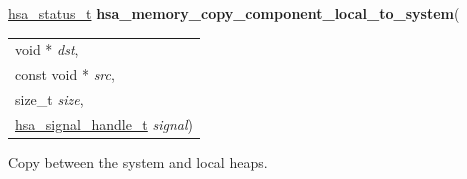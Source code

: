 \documentclass[final]{book}
\newcommand{\hsaarg}[1]{\textit{#1}}
\begin{document}
\noindent\begin{tcolorbox}[breakable,nobeforeafter,colframe=white,colback=lightgray,left=0mm]
\hyperlink{group__status_1gad755322e7ff95456520e8abdbe90d225}{hsa_status_t} \hypertarget{group__memory_1ga292a4a5210b402fbf4320197d1cd3264}{\textbf{hsa_memory_copy_component_local_to_system}}(
\vspace{-3.5mm}\begin{longtable}{@{}p{\textwidth}}
\hspace{1.7em}void * \hsaarg{dst},\\
\hspace{1.7em}const void * \hsaarg{src},\\
\hspace{1.7em}size_t \hsaarg{size},\\
\hspace{1.7em}\hyperlink{group__signals_1ga6592c136d70853d855bc11d9efdbf534}{hsa_signal_handle_t} \hsaarg{signal})\end{longtable}

\end{tcolorbox}
Copy between the system and local heaps.
\end{document}
